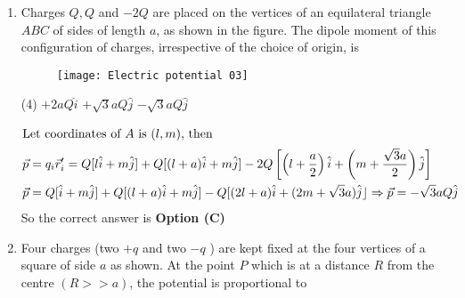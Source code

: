 \begin{enumerate}
	\begin{tasks}(4)
		\task[\textbf{A.}] $r e^{-K r}$
		\task[\textbf{B.}] $\frac{1}{r} e^{-K r}$
		\task[\textbf{C.}] $\frac{1}{r^{2}} e^{-K r}$
		\task[\textbf{D.}] $\frac{1}{r}\left(1-e^{-K r}\right)$
	\end{tasks}
	\begin{answer}
		\begin{align*}
		\text{	since }\nabla^{2} V&=-\rho / \varepsilon_{0}\\
		\nabla^{2} V\text{ must be proportional to }\frac{A}{r} e^{-k r},\text{ where }\nabla^{2} V&=\frac{1}{r^{2}} \frac{\partial}{\partial r}\left(r^{2} \frac{\partial V}{\partial r}\right).
		\end{align*}
		So the correct answer is \textbf{Option (B)}
	\end{answer}
	\item Charges $Q, Q$ and $-2 Q$ are placed on the vertices of an equilateral triangle $A B C$ of sides of length $a$, as shown in the figure. The dipole moment of this configuration of charges, irrespective of the choice of origin, is
	{}
	\begin{figure}[H]
		\centering
		\texttt{[image: Electric potential 03]}
		\caption{}
		\label{}
	\end{figure}
	\begin{tasks}(4)
		\task[\textbf{A.}] $+2 a Q \hat{i}$
		\task[\textbf{B.}] $+\sqrt{3} a Q \hat{j}$
		\task[\textbf{C.}] $-\sqrt{3} a Q \hat{j}$
	\end{tasks}
	\begin{answer}
		\begin{align*}
		\intertext{Let coordinates of $A$ is $(l, m)$, then}
		\vec{p}&=q_{i} \vec{r}_{i}^{\prime}=Q[l \hat{i}+m \hat{j}]+Q[(l+a) \hat{i}+m \hat{j}]-2 Q\left[\left(l+\frac{a}{2}\right) \hat{i}+\left(m+\frac{\sqrt{3} a}{2}\right) \hat{j}\right]\\
		\vec{p}&=Q[\hat{i}+m \hat{j}]+Q[(l+a) \hat{i}+m \hat{j}]-Q[(2 l+a) \hat{i}+(2 m+\sqrt{3} a) \hat{j}\rfloor \Rightarrow \vec{p}=-\sqrt{3} a Q \hat{j}
		\end{align*}
		So the correct answer is \textbf{Option (C)}
	\end{answer}
	\item  Four charges (two $+q$ and two $-q$ ) are kept fixed at the four vertices of a square of side $a$ as shown. At the point $P$ which is at a distance $R$ from the centre $(R>>a)$, the potential is proportional to
	{}

\end{enumerate}
